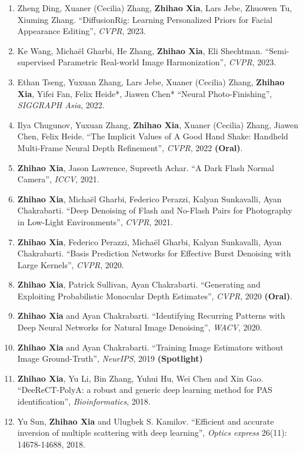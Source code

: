 \documentclass{resume} %
\newcommand{\B}[1]{\textbf{#1}}
\newcommand{\pub}[1]{\textrm{\textit{#1}}}
\begin{document}
\begin{enumerate}
  \item Zheng Ding, Xuaner (Cecilia) Zhang, \B{Zhihao Xia}, Lars Jebe, Zhuowen Tu, Xiuming Zhang. ``DiffusionRig: Learning Personalized Priors for Facial Appearance Editing'', \pub{CVPR}, 2023.
  \item Ke Wang, Michaël Gharbi, He Zhang, \B{Zhihao Xia}, Eli Shechtman. ``Semi-supervised Parametric Real-world Image Harmonization'', \pub{CVPR}, 2023.
  \item Ethan Tseng, Yuxuan Zhang, Lars Jebe, Xuaner (Cecilia) Zhang, \B{Zhihao Xia}, Yifei Fan, Felix Heide*, Jiawen Chen* ``Neural Photo-Finishing'', \pub{SIGGRAPH Asia}, 2022.
  \item Ilya Chugunov, Yuxuan Zhang, \B{Zhihao Xia}, Xuaner (Cecilia) Zhang, Jiawen Chen, Felix Heide. ``The Implicit Values of A Good Hand Shake: Handheld Multi-Frame Neural Depth Refinement'', \pub{CVPR}, 2022 \B{(Oral)}.
  \item \B{Zhihao Xia}, Jason Lawrence, Supreeth Achar. ``A Dark Flash Normal Camera'', \pub{ICCV}, 2021.
  \item \B{Zhihao Xia}, Micha\"el Gharbi, Federico Perazzi, Kalyan Sunkavalli, Ayan Chakrabarti. ``Deep Denoising of Flash and No-Flash Pairs for Photography in Low-Light Environments'', \pub{CVPR}, 2021.
  \item \B{Zhihao Xia}, Federico Perazzi, Micha\"el Gharbi, Kalyan Sunkavalli, Ayan Chakrabarti. ``Basis Prediction Networks for Effective Burst Denoising with Large Kernels'', \pub{CVPR}, 2020.
  \item \B{Zhihao Xia}, Patrick Sullivan, Ayan Chakrabarti. ``Generating and Exploiting Probabilistic Monocular Depth Estimates'', \pub{CVPR}, 2020 \B{(Oral)}.
  \item \B{Zhihao Xia} and Ayan Chakrabarti. ``Identifying Recurring Patterns with Deep Neural Networks for Natural Image Denoising'', \pub{WACV}, 2020.
  \item \B{Zhihao Xia} and Ayan Chakrabarti. ``Training Image Estimators without Image Ground-Truth'', \pub{NeurIPS}, 2019 \B{(Spotlight)}
  \item \B{Zhihao Xia}, Yu Li, Bin Zhang, Yuhui Hu, Wei Chen and Xin Gao. ``DeeReCT-PolyA: a robust and generic deep learning method for PAS identification'', \pub{Bioinformatics}, 2018.
  \item Yu Sun, \B{Zhihao Xia} and Ulugbek S. Kamilov. ``Efficient and accurate inversion of multiple scattering with deep learning'', \pub{Optics express} 26(11): 14678-14688, 2018.
  \end{enumerate}
\end{document}
